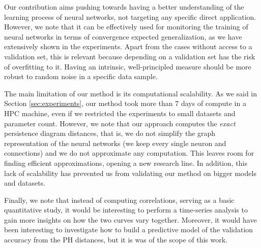 \documentclass{article}
\begin{document}
Our contribution aims pushing towards having a better understanding of the learning process of neural networks, not targeting any specific direct application. However, we note that it can be effectively used for monitoring the training of neural networks in terms of convergence expected generalization, as we have extensively shown in the experiments. Apart from the cases without access to a validation set, this is relevant because depending on a validation set has the risk of overfitting to it. Having an intrinsic, well-principled measure should be more robust to random noise in a specific data sample.

The main limitation of our method is its computational scalability. As we said in Section \ref{sec:experiments}, our method took more than 7 days of compute in a HPC machine, even if we restricted the experiments to small datasets and parameter count. However, we note that our approach computes the \textit{exact} persistence diagram distances, that is, we do not simplify the graph representation of the neural networks (we keep every single neuron and connections) and we do not approximate any computation. This leaves room for finding efficient approximations, opening a new research line. In addition, this lack of scalability has prevented us from validating our method on bigger models and datasets.

Finally, we note that instead of computing correlations, serving as a basic quantitative study, it would be interesting to perform a time-series analysis to gain more insights on how the two curves vary together. Moreover, it would have been interesting to investigate how to build a predictive model of the validation accuracy from the PH distances, but it is was of the scope of this work.


\end{document}
